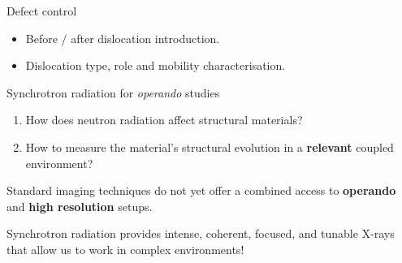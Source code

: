 \begin{column}{\colwidth}
\begin{block}{Defect control}

        \begin{itemize}
            \setlength\itemsep{1em}
            \item Before / after dislocation introduction.
            \item Dislocation type, role and mobility characterisation.
        \end{itemize}

    \end{block}

    \begin{alertblock}{Synchrotron radiation for \textit{operando} studies}

        \centering
        \begin{enumerate}
            \setlength\itemsep{1em}
            \item How does neutron radiation affect structural materials?
            \item How to measure the material's structural evolution in a \textbf{relevant} coupled environment?
        \end{enumerate}

        \bigskip
        Standard imaging techniques do not yet offer a combined access to \textbf{operando} and \textbf{high resolution} setups.

        \bigskip
        Synchrotron radiation provides intense, coherent, focused, and tunable X-rays that allow us to work in complex environments!

    \end{alertblock}

\end{column}
